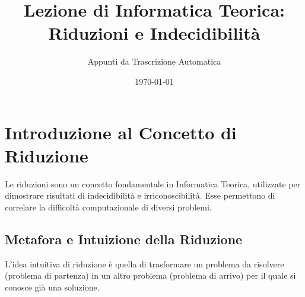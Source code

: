 \documentclass[a4paper]{article}
\title{Lezione di Informatica Teorica: Riduzioni e Indecidibilità}
\author{Appunti da Trascrizione Automatica}
\date{\today}
\begin{document}
\maketitle
\tableofcontents
\newpage

\section{Introduzione al Concetto di Riduzione}

Le riduzioni sono un concetto fondamentale in Informatica Teorica, utilizzate per dimostrare risultati di indecidibilità e irriconoscibilità. Esse permettono di correlare la difficoltà computazionale di diversi problemi.

\subsection{Metafora e Intuizione della Riduzione}
L'idea intuitiva di riduzione è quella di trasformare un problema da risolvere (problema di partenza) in un altro problema (problema di arrivo) per il quale si conosce già una soluzione.
\end{document}
